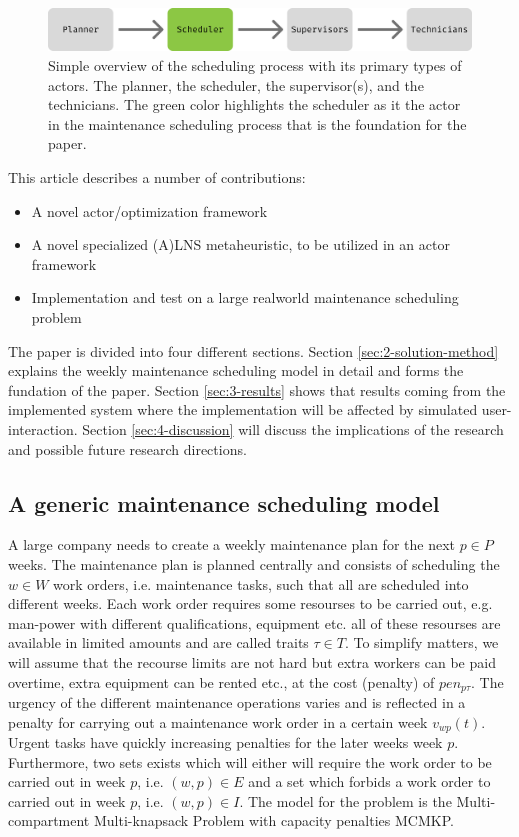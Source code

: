 \documentclass[preprint,12pt,authoryear]{elsarticle}
\begin{document}
\begin{figure}
\includegraphics[width=1.0\textwidth]{figures/Scheduling Process Simple.png}
\caption{Simple overview of the scheduling process with its primary types of actors. The planner, the scheduler, the supervisor(s), and the technicians. The green color highlights the scheduler as it the actor in the maintenance scheduling process that is the foundation for the paper.}
\label{fig:simple-maintenance-process}
\end{figure}

This article describes a number of contributions: 

\begin{itemize}
\item A novel actor/optimization framework
\item A novel specialized (A)LNS metaheuristic, to be utilized in an actor framework
\item Implementation and test on a large realworld maintenance scheduling problem
\end{itemize}

The paper is divided into four different sections. Section \ref{sec:2-solution-method} explains the weekly maintenance scheduling model in detail and forms the fundation of the paper. Section \ref{sec:3-results} shows that results coming from the implemented system where the implementation will be affected by simulated user-interaction. Section \ref{sec:4-discussion} will discuss the implications of the research and possible future research directions.

\subsection{A generic maintenance scheduling model}
\label{sub2sec2}
A large company needs to create a weekly maintenance plan for the next $p \in P$ weeks. The maintenance plan is planned centrally and consists of scheduling the $w \in W$ work orders, i.e. maintenance tasks, such that all are scheduled into different weeks. Each work order requires some resourses to be carried out, e.g. man-power with different qualifications, equipment etc. all of these resourses are available in limited amounts and are called traits $\tau \in T$. To simplify matters, we will assume that the recourse limits are not hard but extra workers can be paid overtime, extra equipment can be rented etc., at the cost (penalty) of $pen_{p\tau}$. The urgency of the different maintenance operations varies and is reflected in a penalty for carrying out a maintenance work order in a certain week $v_{wp}(t)$. Urgent tasks have quickly increasing penalties for the later weeks week $p$. Furthermore, two sets exists which will either will require the work order to be carried out in week $p$, i.e. $(w,p) \in E$ and a set which forbids a work order to carried out in week $p$, i.e. $(w,p) \in I$. The model for the problem is the Multi-compartment Multi-knapsack Problem with capacity penalties MCMKP.
\end{document}
